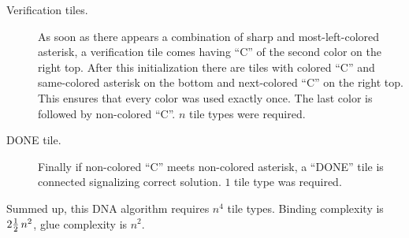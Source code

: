\begin{description}
	\item[Verification tiles.] As soon as there appears a combination of sharp and most-left-colored asterisk, a verification tile comes having ``C'' of the second color on the right top. After this initialization there are tiles with colored ``C'' and same-colored asterisk on the bottom and next-colored ``C'' on the right top. This ensures that every color was used exactly once. The last color is followed by non-colored ``C''. $n$ tile types were required.
	\item[DONE tile.] Finally if non-colored ``C'' meets non-colored asterisk, a ``DONE'' tile is connected signalizing correct solution. $1$ tile type was required.
\end{description}
Summed up, this DNA algorithm requires $n^4$ tile types. Binding complexity is $2\nicefrac{1}{2}\,n^2$, glue complexity is $n^2$.

